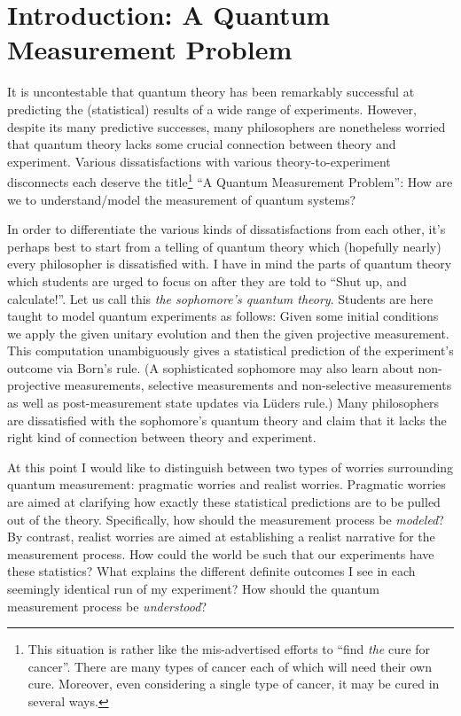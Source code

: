 \documentclass[12pt,prd,superscriptaddress,floatfix,amsmath,amssymb,amsfonts,nofootinbib]{revtex4-2}
\begin{document}
\maketitle
\newpage

\section{Introduction: A Quantum Measurement Problem}\label{Introduction}
It is uncontestable that quantum theory has been remarkably successful at predicting the (statistical) results of a wide range of experiments. However, despite its many predictive successes, many philosophers are nonetheless worried that quantum theory lacks some crucial connection between theory and experiment. Various dissatisfactions with various theory-to-experiment disconnects each deserve the title\footnote{This situation is rather like the mis-advertised efforts to ``find \textit{the} cure for cancer''. There are many types of cancer each of which will need their own cure. Moreover, even considering a single type of cancer, it may be cured in several ways.} ``A Quantum Measurement Problem'': How are we to understand/model the measurement of quantum systems?
    
In order to differentiate the various kinds of dissatisfactions from each other, it's perhaps best to start from a telling of quantum theory which (hopefully nearly) every philosopher is dissatisfied with. I have in mind the parts of quantum theory which students are urged to focus on after they are told to ``Shut up, and calculate!''. Let us call this \textit{the sophomore's quantum theory}. Students are here taught to model quantum experiments as follows: Given some initial conditions we apply the given unitary evolution and then the given projective measurement. This computation unambiguously gives a statistical prediction of the experiment's outcome via Born's rule. (A sophisticated sophomore may also learn about non-projective measurements, selective measurements and non-selective measurements as well as post-measurement state updates via L\"uders rule.) Many philosophers are dissatisfied with the sophomore's quantum theory and claim that it lacks the right kind of connection between theory and experiment.

At this point I would like to distinguish between two types of worries surrounding quantum measurement: pragmatic worries and realist worries. Pragmatic worries are aimed at clarifying how exactly these statistical predictions are to be pulled out of the theory. Specifically, how should the measurement process be \textit{modeled}? By contrast, realist worries are aimed at establishing a realist narrative for the measurement process. How could the world be such that our experiments have these statistics? What explains the different definite outcomes I see in each seemingly identical run of my experiment? How should the quantum measurement process be \textit{understood}?
\end{document}
